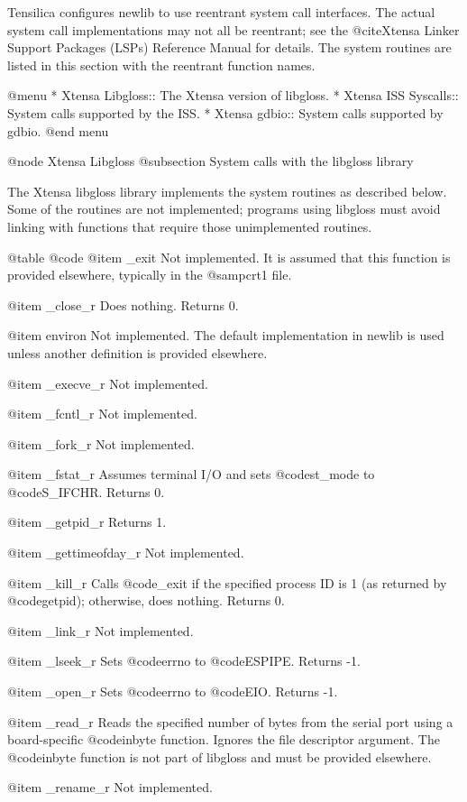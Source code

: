 Tensilica configures newlib to use reentrant system call interfaces.
The actual system call implementations may not all be reentrant; see
the @cite{Xtensa Linker Support Packages (LSPs) Reference Manual} for
details.  The system routines are listed in this section with the
reentrant function names.

@menu
* Xtensa Libgloss::		The Xtensa version of libgloss.
* Xtensa ISS Syscalls:: 	System calls supported by the ISS.
* Xtensa gdbio::		System calls supported by gdbio.
@end menu

@node Xtensa Libgloss
@subsection System calls with the libgloss library

The Xtensa libgloss library implements the system routines as described
below.  Some of the routines are not implemented; programs using
libgloss must avoid linking with functions that require those
unimplemented routines.

@table @code
@item _exit
Not implemented.  It is assumed that this function is provided
elsewhere, typically in the @samp{crt1} file.

@item _close_r
Does nothing.  Returns 0.

@item environ
Not implemented.  The default implementation in newlib is used unless
another definition is provided elsewhere.

@item _execve_r
Not implemented.

@item _fcntl_r
Not implemented.

@item _fork_r
Not implemented.

@item _fstat_r
Assumes terminal I/O and sets @code{st_mode} to @code{S_IFCHR}.
Returns 0.

@item _getpid_r
Returns 1.

@item _gettimeofday_r
Not implemented.

@item _kill_r
Calls @code{_exit} if the specified process ID is 1 (as returned by
@code{getpid}); otherwise, does nothing.  Returns 0.

@item _link_r
Not implemented.

@item _lseek_r
Sets @code{errno} to @code{ESPIPE}.  Returns -1.

@item _open_r
Sets @code{errno} to @code{EIO}.  Returns -1.

@item _read_r
Reads the specified number of bytes from the serial port using a
board-specific @code{inbyte} function.  Ignores the file descriptor
argument.  The @code{inbyte} function is not part of libgloss and must
be provided elsewhere.

@item _rename_r
Not implemented.

